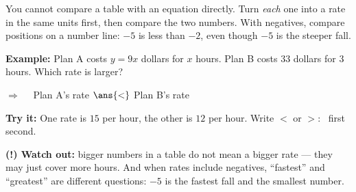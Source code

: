 \documentclass[12pt]{article}
\begin{document}

\begin{formulabox}
You cannot compare a table with an equation directly. Turn \emph{each} one into
a rate in the same units first, then compare the two numbers. With negatives,
compare positions on a number line: $-5$ is less than $-2$, even though $-5$ is
the steeper fall.
\end{formulabox}

\begin{examplebox}
\textbf{Example:} \quad Plan A costs $y = 9x$ dollars for $x$ hours. Plan B
costs $33$ dollars for $3$ hours. Which rate is larger?

$\Rightarrow\quad$ Plan A's rate $\ans{<}$ Plan B's rate
\end{examplebox}

\begin{tryitbox}
\textbf{Try it:} \quad One rate is $15$ per hour, the other is $12$ per hour.
Write $<$ or $>$: \ first \underline{\hspace{0.9cm}} second.\\[2pt]
\end{tryitbox}

\begin{watchoutbox}
\textbf{(!) Watch out:} bigger numbers in a table do not mean a bigger rate ---
they may just cover more hours. And when rates include negatives, ``fastest''
and ``greatest'' are different questions: $-5$ is the fastest fall and the
smallest number.
\end{watchoutbox}
\end{document}
